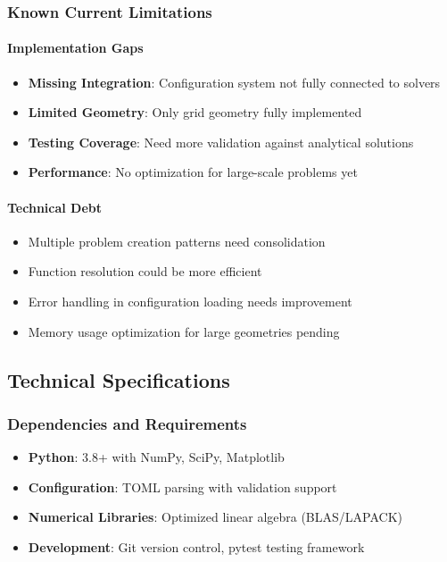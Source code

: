 \subsubsection{Known Current Limitations}

\paragraph{Implementation Gaps}
\begin{itemize}
    \item \textbf{Missing Integration}: Configuration system not fully connected to solvers
    \item \textbf{Limited Geometry}: Only grid geometry fully implemented
    \item \textbf{Testing Coverage}: Need more validation against analytical solutions
    \item \textbf{Performance}: No optimization for large-scale problems yet
\end{itemize}

\paragraph{Technical Debt}
\begin{itemize}
    \item Multiple problem creation patterns need consolidation
    \item Function resolution could be more efficient
    \item Error handling in configuration loading needs improvement
    \item Memory usage optimization for large geometries pending
\end{itemize}

\subsection{Technical Specifications}

\subsubsection{Dependencies and Requirements}
\begin{itemize}
    \item \textbf{Python}: 3.8+ with NumPy, SciPy, Matplotlib
    \item \textbf{Configuration}: TOML parsing with validation support
    \item \textbf{Numerical Libraries}: Optimized linear algebra (BLAS/LAPACK)
    \item \textbf{Development}: Git version control, pytest testing framework
\end{itemize}

